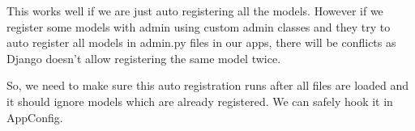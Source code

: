 \documentclass[letterpaper,11pt,english]{sphinxmanual}
\begin{document}
\begin{sphinxVerbatim}[commandchars=\\\{\}]
   


  

   
\end{sphinxVerbatim}

This works well if we are just auto registering all the models. However if we register some models with admin using custom admin classes and they try to auto register all models in admin.py files in our apps, there will be conflicts as Django doesn’t allow registering the same model twice.

\begin{sphinxVerbatim}[commandchars=\\\{\}]
   

   

 
        

 


  

   
\end{sphinxVerbatim}

So, we need to make sure this auto registration runs after all  files are loaded and it should ignore models which are already registered. We can safely hook it in AppConfig.
\end{document}
